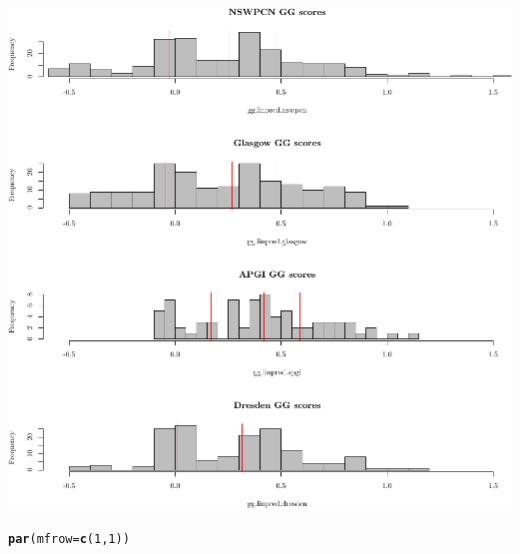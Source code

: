 \documentclass{article}\usepackage[]{graphicx}\usepackage[]{color}
\makeatletter
\def\maxwidth{ %
  \ifdim\Gin@nat@width>\linewidth
    \linewidth
  \else
    \Gin@nat@width
  \fi
}
\newcommand{\hlnum}[1]{\textcolor[rgb]{0.686,0.059,0.569}{#1}}%
\newcommand{\hlstd}[1]{\textcolor[rgb]{0.345,0.345,0.345}{#1}}%
\newcommand{\hlkwc}[1]{\textcolor[rgb]{0.333,0.667,0.333}{#1}}%
\newcommand{\hlkwd}[1]{\textcolor[rgb]{0.737,0.353,0.396}{\textbf{#1}}}%
\newenvironment{kframe}{%
 \def\at@end@of@kframe{}%
 \ifinner\ifhmode%
  \def\at@end@of@kframe{\end{minipage}}%
  \begin{minipage}{\columnwidth}%
 \fi\fi%
 \def\FrameCommand##1{\hskip\@totalleftmargin \hskip-\fboxsep
 \colorbox{shadecolor}{##1}\hskip-\fboxsep
     \hskip-\linewidth \hskip-\@totalleftmargin \hskip\columnwidth}%
 \MakeFramed {\advance\hsize-\width
   \@totalleftmargin\z@ \linewidth\hsize
   \@setminipage}}%
 {\par\unskip\endMakeFramed%
 \at@end@of@kframe}
\newenvironment{knitrout}{}{} %
\makeatother
\begin{document}
\begin{knitrout}
{\centering \includegraphics[width=\maxwidth]{figure/07-score-hists-1} 

}


\begin{kframe}\begin{alltt}
\hlkwd{par}\hlstd{(}\hlkwc{mfrow} \hlstd{=} \hlkwd{c}\hlstd{(}\hlnum{1}\hlstd{,} \hlnum{1}\hlstd{))}
\end{alltt}
\end{kframe}
\end{knitrout}
\end{document}
